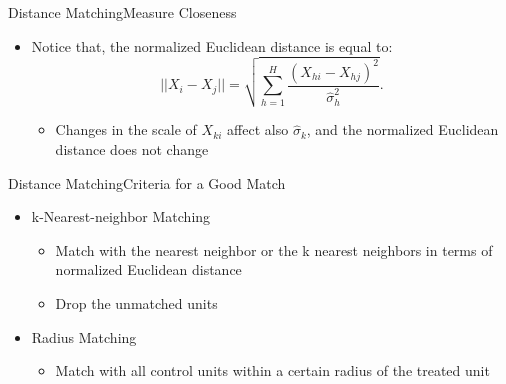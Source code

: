 \documentclass[hyperref={pdfpagelabels=false}]{beamer}
\begin{document}
\begin{frame}{Distance Matching}{Measure Closeness}
	\begin{itemize}
		
	
		\item Notice that, the normalized Euclidean distance is equal to:
		\begin{equation*}
		||X_i-X_j||=\sqrt{\sum^H_{h=1}\dfrac{(X_{hi}-X_{hj})^2}{\hat{\sigma}^2_h}}.
		\end{equation*}
		\begin{itemize}
			\item[$\Rightarrow$] Changes in the scale of $X_{ki}$ affect also $\hat{\sigma}_k$, and the normalized Euclidean distance does not change
		\end{itemize}
		
	\end{itemize}
\end{frame}




\begin{frame}{Distance Matching}{Criteria for a Good Match}
	\begin{itemize}
		
		\item k-Nearest-neighbor Matching
		\vspace{0.2cm}	
		\begin{itemize}
			\item Match with the nearest neighbor or the k nearest neighbors in terms of normalized Euclidean distance 
			\vspace{0.2cm}
			\item Drop the unmatched units
						\vspace{0.2cm}
		\end{itemize}
	
	\item Radius Matching
		\vspace{0.2cm}	
	\begin{itemize}
		\item Match with all control units within a certain radius of the treated unit
	\end{itemize}
	
	
	
	\end{itemize}
\end{frame}
\end{document}
